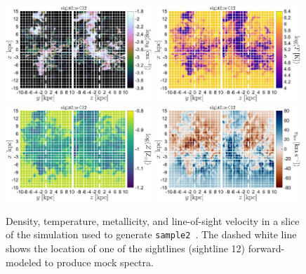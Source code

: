 \documentclass[fleqn,usenatbib]{mnras}
\begin{document}
\begin{figure}
    \centering
    \includegraphics[width=0.49\textwidth]{figures/sample2/projections/density_projection_maps_SL_12.jpg}
    \includegraphics[width=0.49\textwidth]{figures/sample2/projections/temperature_projection_maps_SL_12.jpg} \\
    \includegraphics[width=0.49\textwidth]{figures/sample2/projections/metallicity_projection_maps_SL_12.jpg}
    \includegraphics[width=0.49\textwidth]{figures/sample2/projections/velocity_projection_maps_SL_12.jpg}
    \caption{
    Density, temperature, metallicity, and line-of-sight velocity in a slice of the simulation used to generate \texttt{sample2}~\citep{mandelker2020Instability}.
    The dashed white line shows the location of one of the sightlines (sightline 12) forward-modeled to produce mock spectra.
    }
    \label{f: sample2 ray 12}
\end{figure}
\end{document}
